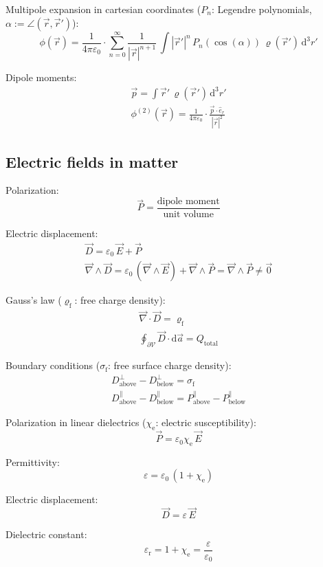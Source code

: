 \documentclass[fontsize=11pt,a4paper]{scrartcl}
\begin{document}
Multipole expansion in cartesian coordinates ($P_n$: Legendre polynomials, $\alpha:=\angle\left(\vec r,\vec r'\right)$):
\[
	\phi(\vec r)=\frac{1}{4\pi\varepsilon_0}\cdot\sum_{n=0}^\infty\frac{1}{|\vec r|^{n+1}}\,\int|\vec r'|^n\,P_n\left(\cos(\alpha)\right)\,\varrho(\vec r')\,\mathrm{d}^3 r'
\]

Dipole moments:
\begin{gather*}
	\vec p=\int\vec r'\,\varrho(\vec r')\,\mathrm{d}^3 r'\\
	\phi^{(2)}(\vec r)=\frac{1}{4\pi\varepsilon_0}\cdot\frac{\vec p\cdot\hat e_r}{|\vec r|^2}
\end{gather*}
%
%
%
%
\subsection{Electric fields in matter}
Polarization:
\[
	\vec P=\frac{\text{dipole moment}}{\text{unit volume}}
\]

Electric displacement:
\begin{gather*}
	\vec D=\varepsilon_0\,\vec E+\vec P\\
	\vec\nabla\wedge\vec D=\varepsilon_0\,(\vec\nabla\wedge\vec E)+\vec\nabla\wedge\vec P=
		\vec\nabla\wedge\vec P\neq\vec 0
\end{gather*}

Gauss's law ($\varrho_\mathrm{f}$: free charge density):
\begin{gather*}
	\vec\nabla\cdot\vec D = \varrho_\mathrm{f}\\
	\oint_{\partial\mathcal{V}}\vec D\cdot\mathrm{d}\vec a = Q_\mathrm{total}
\end{gather*}

Boundary conditions ($\sigma_\mathrm{f}$: free surface charge density):
\begin{gather*}
	D_\text{above}^\perp -D_\text{below}^\perp = \sigma_\mathrm{f}\\
	D_\text{above}^\parallel - D_\text{below}^\parallel = P_\text{above}^\parallel - P_\text{below}^\parallel
\end{gather*}

Polarization in linear dielectrics ($\chi_\mathrm{e}$: electric susceptibility):
\[
	\vec P=\varepsilon_0\chi_\mathrm{e}\,\vec E
\]

Permittivity:
\[
	\varepsilon=\varepsilon_0\,(1+\chi_\mathrm{e})
\]

Electric displacement:
\[
	\vec D=\varepsilon\,\vec E
\]

Dielectric constant:
\[
	\varepsilon_\mathrm{r} = 1+\chi_\mathrm{e}=\frac{\varepsilon}{\varepsilon_0}
\]
%
%
%
%
\end{document}
